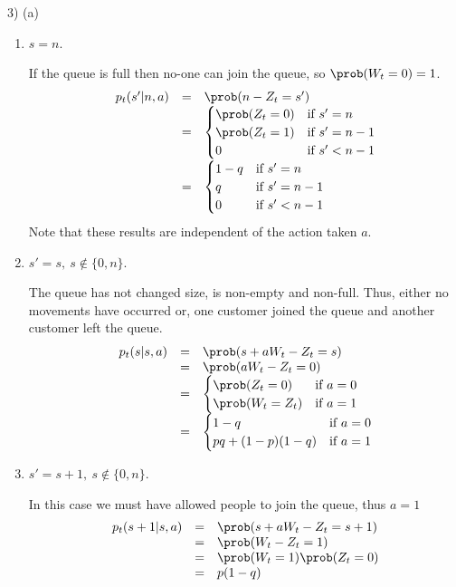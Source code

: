 \documentclass[11pt,a4paper]{article}
\begin{document}
\begin{answer}{3) (a)}
\begin{itemize}
\begin{enumerate}
      \item $s=n$.
      \par If the queue is full then no-one can join the queue, so $\prob(W_t=0)=1$.
      \[\begin{array}{rcl}
        p_t(s'|n,a)&=&\prob(n-Z_t=s')\\
                   &=& \begin{cases}
                         \prob(Z_t=0)&\text{if }s'=n\\
                         \prob(Z_t=1)&\text{if }s'=n-1\\
                         0&\text{if }s'<n-1
                       \end{cases}\\
                   &=& \begin{cases}
                         1-q&\text{if }s'=n\\
                         q&\text{if }s'=n-1\\
                         0&\text{if }s'<n-1
                       \end{cases}\\
      \end{array}\]
      Note that these results are independent of the action taken $a$.

      \item $s'=s,\ s\not\in\{0,n\}$.
      \par The queue has not changed size, is non-empty and non-full. Thus, either no movements have occurred or, one customer joined the queue and another customer left the queue.
      \[\begin{array}{rcl}
        p_t(s|s,a)&=&\prob(s+aW_t-Z_t=s)\\
        &=&\prob(aW_t-Z_t=0)\\
        &=&\begin{cases}
             \prob(Z_t=0)&\text{if }a=0\\
             \prob(W_t=Z_t)&\text{if }a=1
           \end{cases}\\
        &=&\begin{cases}
            1-q&\text{if }a=0\\
            pq+(1-p)(1-q)&\text{if }a=1
          \end{cases}
      \end{array}\]

      \item $s'=s+1,\ s\not\in\{0,n\}$.
      \par In this case we must have allowed people to join the queue, thus $a=1$
      \[\begin{array}{rcl}
        p_t(s+1|s,a)&=&\prob(s+aW_t-Z_t=s+1)\\
        &=&\prob(W_t-Z_t=1)\\
        &=&\prob(W_t=1)\prob(Z_t=0)\\
        &=&p(1-q)
      \end{array}\]


\end{enumerate}
\end{itemize}
\end{answer}
\end{document}
